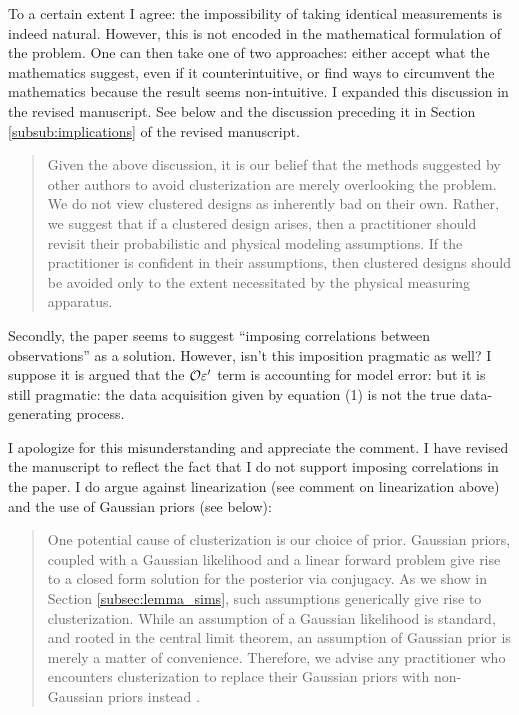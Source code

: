 \AR To a certain extent I agree: the impossibility of taking identical
measurements is indeed natural. However, this is not encoded in the
mathematical formulation of the problem. One can then take one of two
approaches: either accept what the mathematics suggest, even if it
counterintuitive, or find ways to circumvent the mathematics because
the result seems non-intuitive. I expanded this discussion in the
revised manuscript. See below and the discussion preceding it in
Section \ref{subsub:implications} of the revised manuscript. 

\begin{quote}%
  Given the above discussion, it is our belief that the methods
  suggested by other authors to avoid clusterization are merely
  overlooking the problem. We do not view clustered designs as
  inherently bad on their own. Rather, we suggest that if a clustered
  design arises, then a practitioner should revisit their probabilistic
  and physical modeling assumptions. If the practitioner is confident in
  their assumptions, then clustered designs should be avoided only to
  the extent necessitated by the physical measuring apparatus.
\end{quote}


\RC Secondly, the paper seems to suggest “imposing correlations
between observations” as a solution. However, isn’t this imposition
pragmatic as well? I suppose it is argued that the $\mathcal{O} \varepsilon'$ term
is accounting for model error: but it is still pragmatic: the data
acquisition given by equation (1) is not the true data-generating
process.

\AR I apologize for this misunderstanding and appreciate the
comment. I have revised the manuscript to reflect the fact that I do
not support imposing correlations in the paper. I do argue against
linearization (see comment on linearization above) and the use of Gaussian priors (see below):

\begin{quote} %
One potential cause of clusterization is our choice of prior. Gaussian
priors, coupled with a Gaussian likelihood and a linear forward
problem give rise to a closed form solution for the posterior via
conjugacy. As we show in Section \ref{subsec:lemma_sims}, such
assumptions generically give rise to clusterization. While an
assumption of a Gaussian likelihood is standard, and rooted in the
central limit theorem, an assumption of Gaussian prior is merely a
matter of convenience. Therefore, we advise any practitioner who
encounters clusterization to replace their Gaussian priors with
non-Gaussian priors instead \cite{hosseini2017, hosseini2019}.
\end{quote}


